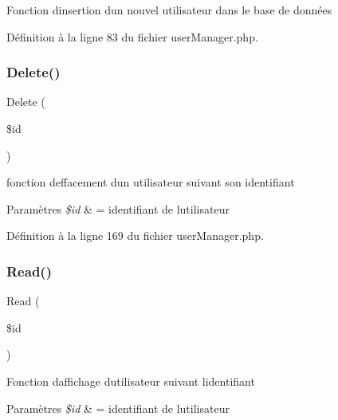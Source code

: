 Fonction d\textquotesingle{}insertion d\textquotesingle{}un nouvel utilisateur dans le base de données 

Définition à la ligne 83 du fichier user\+Manager.\+php.

\mbox{\label{class_src_1_1_managers_1_1user_manager_a59113b5ecd1d155db6a4f30af34a1e80}} 
\subsubsection{\texorpdfstring{Delete()}{Delete()}}
{\footnotesize\ttfamily Delete (\begin{DoxyParamCaption}\item[{}]{\$id }\end{DoxyParamCaption})}

fonction d\textquotesingle{}effacement d\textquotesingle{}un utilisateur suivant son identifiant 
\begin{DoxyParams}{Paramètres}
{\em \$id} & = identifiant de l\textquotesingle{}utilisateur \\
\hline
\end{DoxyParams}


Définition à la ligne 169 du fichier user\+Manager.\+php.

\mbox{\label{class_src_1_1_managers_1_1user_manager_ad2bbc9b3130abdfe3a9fc9e9fe36716f}} 
\subsubsection{\texorpdfstring{Read()}{Read()}}
{\footnotesize\ttfamily Read (\begin{DoxyParamCaption}\item[{}]{\$id }\end{DoxyParamCaption})}

Fonction d\textquotesingle{}affichage d\textquotesingle{}utilisateur suivant l\textquotesingle{}identifiant 
\begin{DoxyParams}{Paramètres}
{\em \$id} & = identifiant de l\textquotesingle{}utilisateur \\
\hline
\end{DoxyParams}


